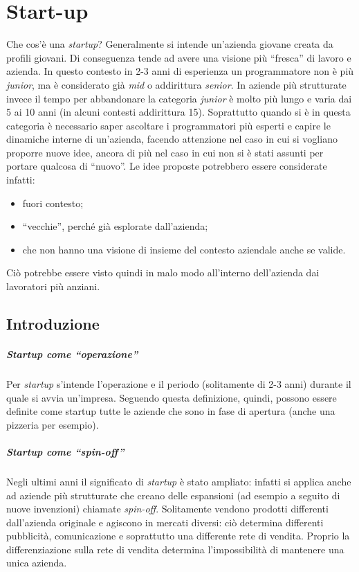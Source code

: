 \chapter{Start-up}

Che cos'è una \textit{startup}? Generalmente si intende un'azienda giovane
creata da profili giovani. Di conseguenza tende ad avere una visione più
``fresca'' di lavoro e azienda. In questo contesto in 2-3 anni di esperienza
un programmatore non è più \textit{junior}, ma è considerato già \textit{mid}
o addirittura \textit{senior}. In aziende più strutturate invece il tempo
per abbandonare la categoria \textit{junior} è molto più lungo e varia dai 5
ai 10 anni (in alcuni contesti addirittura 15). Soprattutto quando si è in
questa categoria è necessario saper ascoltare i programmatori più esperti e
capire le dinamiche interne di un'azienda, facendo attenzione nel caso in
cui si vogliano proporre nuove idee, ancora di più nel caso in cui non si è
stati assunti per portare qualcosa di ``nuovo''. Le idee proposte potrebbero
essere considerate infatti:
\begin{itemize}
  \item fuori contesto;
  \item ``vecchie'', perché già esplorate dall'azienda;
  \item che non hanno una visione di insieme del contesto aziendale anche se
  valide.
\end{itemize}
Ciò potrebbe essere visto quindi in malo modo all'interno dell'azienda dai
lavoratori più anziani.

\section{Introduzione}

\paragraph*{Startup come ``operazione''} Per \textit{startup} s'intende
l'operazione e il periodo (solitamente di 2-3 anni) durante il quale si avvia
un'impresa. Seguendo questa definizione, quindi, possono essere definite come
startup tutte le aziende che sono in fase di apertura (anche una pizzeria per
esempio).

\paragraph*{Startup come ``spin-off''}
Negli ultimi anni il significato di \textit{startup} è stato ampliato: infatti
si applica anche ad aziende più strutturate che creano delle espansioni (ad
esempio a seguito di nuove invenzioni) chiamate \textit{spin-off}. Solitamente
vendono prodotti differenti dall'azienda originale e agiscono in mercati
diversi: ciò determina differenti pubblicità, comunicazione e soprattutto
una differente rete di vendita. Proprio la differenziazione sulla rete di
vendita determina l'impossibilità di mantenere una unica azienda.

